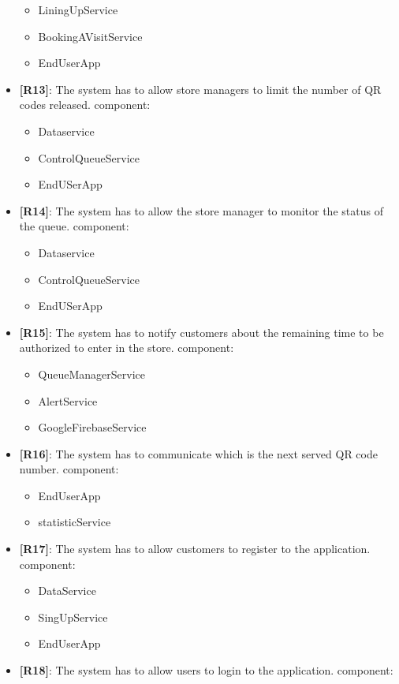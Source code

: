 \begin{itemize}
\begin{itemize}
	\item LiningUpService 
	\item BookingAVisitService  
	\item EndUserApp 
	\end{itemize}
	\item {\textbf{[R13]}}: The system has to allow store managers to limit the number of QR codes released.
component:
	\begin{itemize}
	\item Dataservice 
	\item ControlQueueService 
	\item EndUSerApp 
	\end{itemize}
	\item {\textbf{[R14]}}: The system has to allow the store manager to monitor the status of the queue.
component:
	\begin{itemize}
	\item Dataservice 
	\item ControlQueueService 
	\item EndUSerApp 
	\end{itemize}
	\item {\textbf{[R15]}}: The system has to notify customers about the remaining time to be authorized to enter in the store.
component:
	\begin{itemize}
	\item QueueManagerService  
	\item AlertService  
	\item GoogleFirebaseService 
	\end{itemize}
	\item {\textbf{[R16]}}: The system has to communicate which is the next served QR code number.
component:
	\begin{itemize}
	\item EndUserApp 
	\item statisticService
	\end{itemize}
	\item {\textbf{[R17]}}: The system has to allow customers to register to the application.
component:
	\begin{itemize}
	\item DataService 
	\item SingUpService
	\item EndUserApp  
	\end{itemize}
	\item {\textbf{[R18]}}: The system has to allow users to login to the application.
component:
	\begin{itemize}

\end{itemize}
\end{itemize}
